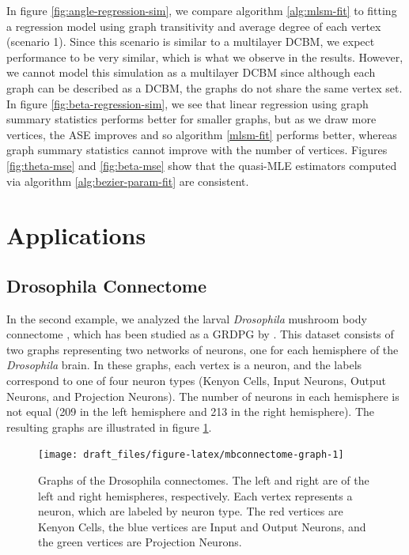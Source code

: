 \documentclass[12pt]{article}
\begin{document}
In figure \ref{fig:angle-regression-sim}, we compare algorithm
\ref{alg:mlsm-fit} to fitting a regression model using graph
transitivity and average degree of each vertex (scenario 1). Since this
scenario is similar to a multilayer DCBM, we expect performance to be
very similar, which is what we observe in the results. However, we
cannot model this simulation as a multilayer DCBM since although each
graph can be described as a DCBM, the graphs do not share the same
vertex set. In figure \ref{fig:beta-regression-sim}, we see that linear
regression using graph summary statistics performs better for smaller
graphs, but as we draw more vertices, the ASE improves and so algorithm
\ref{mlsm-fit} performs better, whereas graph summary statistics cannot
improve with the number of vertices. Figures \ref{fig:theta-mse} and
\ref{fig:beta-mse} show that the quasi-MLE estimators computed via
algorithm \ref{alg:bezier-param-fit} are consistent.

\section{Applications}\label{applications}

\subsection{Drosophila Connectome}\label{drosophila-connectome}

In the second example, we analyzed the larval \emph{Drosophila} mushroom
body connectome \citep{Eichler141762}, which has been studied as a GRDPG
by \citet{athreya2020estimation}. This dataset consists of two graphs
representing two networks of neurons, one for each hemisphere of the
\emph{Drosophila} brain. In these graphs, each vertex is a neuron, and
the labels correspond to one of four neuron types (Kenyon Cells, Input
Neurons, Output Neurons, and Projection Neurons). The number of neurons
in each hemisphere is not equal (209 in the left hemisphere and 213 in
the right hemisphere). The resulting graphs are illustrated in figure
\ref{fig:mbconnectome-graph}.

\begin{figure}[H]

{\centering \texttt{[image: draft\_files/figure-latex/mbconnectome-graph-1]} 

}

\caption{Graphs of the Drosophila connectomes. The left and right are of the left and right hemispheres, respectively. Each vertex represents a neuron, which are labeled by neuron type. The red vertices are Kenyon Cells, the blue vertices are Input and Output Neurons, and the green vertices are Projection Neurons.}\label{fig:mbconnectome-graph}
\end{figure}
\end{document}

